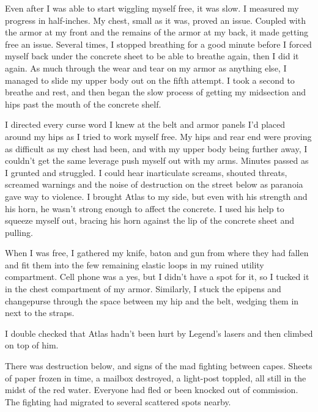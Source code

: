 Even after I was able to start wiggling myself free, it was slow.  I measured my progress in half-inches.  My chest, small as it was, proved an issue.  Coupled with the armor at my front and the remains of the armor at my back, it made getting free an issue.  Several times, I stopped breathing for a good minute before I forced myself back under the concrete sheet to be able to breathe again, then I did it again.  As much through the wear and tear on my armor as anything else, I managed to slide my upper body out on the fifth attempt.  I took a second to breathe and rest, and then began the slow process of getting my midsection and hips past the mouth of the concrete shelf.



I directed every curse word I knew at the belt and armor panels I'd placed around my hips as I tried to work myself free.  My hips and rear end were proving as difficult as my chest had been, and with my upper body being further away, I couldn't get the same leverage push myself out with my arms.  Minutes passed as I grunted and struggled.  I could hear inarticulate screams, shouted threats, screamed warnings and the noise of destruction on the street below as paranoia gave way to violence.  I brought Atlas to my side, but even with his strength and his horn, he wasn't strong enough to affect the concrete.  I used his help to squeeze myself out, bracing his horn against the lip of the concrete sheet and pulling.



When I was free, I gathered my knife, baton and gun from where they had fallen and fit them into the few remaining elastic loops in my ruined utility compartment.  Cell phone was a yes, but I didn't have a spot for it, so I tucked it in the chest compartment of my armor.  Similarly, I stuck the epipens and changepurse through the space between my hip and the belt, wedging them in next to the straps.



I double checked that Atlas hadn't been hurt by Legend's lasers and then climbed on top of him.



There was destruction below, and signs of the mad fighting between capes.  Sheets of paper frozen in time, a mailbox destroyed, a light-post toppled, all still in the midst of the red water.  Everyone had fled or been knocked out of commission.  The fighting had migrated to several scattered spots nearby.



